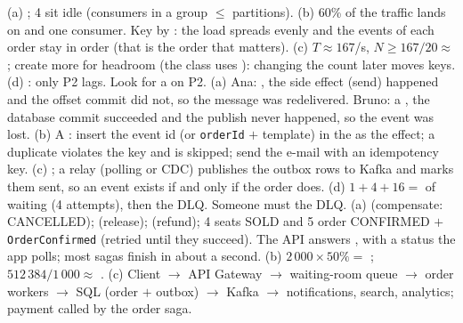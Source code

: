  (a) ; 4 sit idle (consumers in a group $\le$ partitions). (b) 60\% of the traffic lands on  and one consumer. Key by : the load spreads evenly and the events of each order stay in order (that is the order that matters). (c) $T \approx 167$/s, $N \ge 167/20 \approx$ ; create more for headroom (the class uses ): changing the count later moves keys. (d) : only P2 lags. Look for a  on P2.
 (a) Ana: , the side effect (send) happened and the offset commit did not, so the message was redelivered. Bruno: a , the database commit succeeded and the publish never happened, so the event was lost. (b) A : insert the event id (or \texttt{orderId} $+$ template) in the  as the effect; a duplicate violates the key and is skipped; send the e-mail with an idempotency key. (c) ; a relay (polling or CDC) publishes the outbox rows to Kafka and marks them sent, so an event exists if and only if the order does. (d) $1 + 4 + 16 =$  of waiting (4 attempts), then the DLQ. Someone must  the DLQ.
 (a)  (compensate: CANCELLED);  (release);  (refund); 4 seats SOLD and 5 order CONFIRMED $+$ \texttt{OrderConfirmed} (retried until they succeed). The API answers , with a status the app polls; most sagas finish in about a second. (b) $2\,000 \times 50\% =$ ; $512\,384/1\,000 \approx$ . (c) Client $\to$ API Gateway $\to$ waiting-room queue $\to$ order workers $\to$ SQL (order $+$ outbox) $\to$ Kafka $\to$ notifications, search, analytics; payment called by the order saga.
